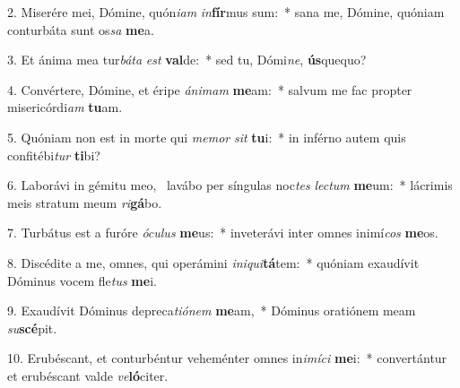 2. Miserére mei, Dómine, quón\textit{i}\textit{am} \textit{in}\textbf{fír}mus sum:~*  sana me, Dómine, quóniam conturbáta sunt os\textit{sa} \textbf{me}a.\

3. Et ánima mea tur\textit{bá}\textit{ta} \textit{est} \textbf{val}de:~*  sed tu, Dómi\textit{ne}, \textbf{ús}quequo?\

4. Convértere, Dómine, et éripe \textit{á}\textit{ni}\textit{mam} \textbf{me}am:~*  salvum me fac propter misericórdi\textit{am} \textbf{tu}am.\

5. Quóniam non est in morte qui \textit{me}\textit{mor} \textit{sit} \textbf{tu}i:~*  in inférno autem quis confitébi\textit{tur} \textbf{ti}bi?\

6. Laborávi in gémitu meo, \dag\  lavábo per síngulas noc\textit{tes} \textit{lec}\textit{tum} \textbf{me}um:~*  lácrimis meis stratum meum \textit{ri}\textbf{gá}bo.\

7. Turbátus est a furóre \textit{ó}\textit{cu}\textit{lus} \textbf{me}us:~*  inveterávi inter omnes inimí\textit{cos} \textbf{me}os.\

8. Discédite a me, omnes, qui operámini \textit{in}\textit{i}\textit{qui}\textbf{tá}tem:~*  quóniam exaudívit Dóminus vocem fle\textit{tus} \textbf{me}i.\

9. Exaudívit Dóminus depreca\textit{ti}\textit{ó}\textit{nem} \textbf{me}am,~*  Dóminus oratiónem meam \textit{su}\textbf{scé}pit.\

10. Erubéscant, et conturbéntur veheménter omnes in\textit{i}\textit{mí}\textit{ci} \textbf{me}i:~*  convertántur et erubéscant valde \textit{ve}\textbf{ló}citer.\

